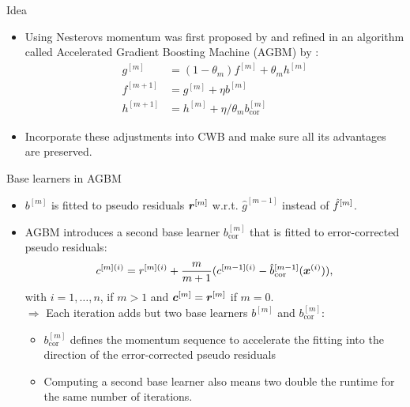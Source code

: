 \documentclass[t,10pt]{beamer}
\begin{document}
\begin{frame}{Idea}

  \begin{itemize}
    \item
      Using Nesterovs momentum was first proposed by \cite{biau2019accelerated} and refined in an algorithm called Accelerated Gradient Boosting Machine (AGBM) by \cite{lu2020accelerating}:
      \begin{align*}
      g^{[m]} &= (1 - \theta_m) f^{[m]} + \theta_m h^{[m]}\\
      f^{[m+1]} &= g^{[m]} + \eta b^{[m]} \\
      h^{[m+1]} &= h^{[m]} + \eta / \theta_m b^{[m]}_{\text{cor}}
      \end{align*}
    \item
      Incorporate these adjustments into CWB and make sure all its advantages are preserved.
  \end{itemize}

\end{frame}


\begin{frame}{Base learners in AGBM}
  \begin{itemize}
    \item
      \(b^{[m]}\) is fitted to pseudo residuals \(\bm{r}^{[m]}\) w.r.t.
      \(\hat{g}^{[m-1]}\) instead of \(\hat{f}^{[m]}\).

    \item
      AGBM introduces a second base learner $b^{[m]}_{\text{cor}}$ that is fitted to error-corrected pseudo residuals:
      \[c^{[m](i)} = r^{[m](i)} + \frac{m}{m+1}(c^{[m-1](i)} - \hat{b}_{\text{cor}}^{[m-1]}(\bm{x}^{(i)})),\]
      with \(i = 1, \dots, n\), if \(m > 1\) and \(\bm{c}^{[m]} = \bm{r}^{[m]}\) if
      \(m = 0\).\\[0.2cm]
      $\Rightarrow$ Each iteration adds but two base learners $b^{[m]}$ and $b^{[m]}_{\text{cor}}$:
      \begin{itemize}
        \item $b^{[m]}_{\text{cor}}$ defines the momentum sequence to accelerate the fitting into the direction of the error-corrected pseudo residuals
        \item Computing a second base learner also means two double the runtime for the same number of iterations.
      \end{itemize}
  \end{itemize}
\end{frame}
\end{document}
